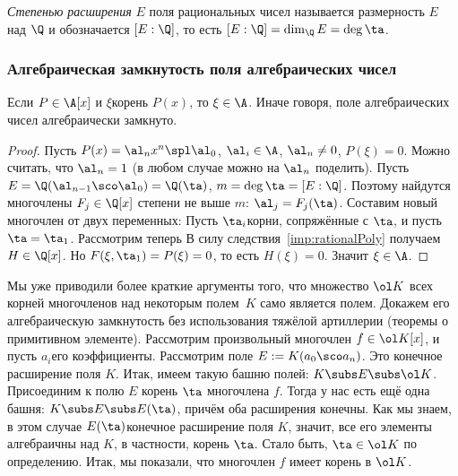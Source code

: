 \documentclass[a4paper]{article}
\begin{document}
\begin{df}
\emph{Степенью расширения} $E$ поля рациональных чисел называется размерность $E$ над $\Q$ и
обозначается $[E:\Q]$, то есть $[E:\Q]=\dim_{\Q}E=\deg\ta$.
\end{df}

\subsubsection{Алгебраическая замкнутость поля алгебраических чисел}

\begin{theorem}\label{thm:algClosureClosed}
Если $P\in\A[x]$ и $\xi$\т корень $P(x)$, то $\xi\in\A$. Иначе говоря, поле алгебраических чисел
алгебраически замкнуто.
\end{theorem}
\begin{proof}
Пусть $P(x)=\al_n x^n\spl \al_0$, $\al_i\in\A$, $\al_n\neq0$, $P(\xi)=0$. Можно считать,
что $\al_n=1$ (в любом случае можно на $\al_n$ поделить). Пусть
$E=\Q(\al_{n-1}\sco \al_0)=\Q(\ta)$, $m=\deg \ta=[E:\Q]$. Поэтому найдутся
многочлены $F_j\in\Q[x]$ степени не выше $m$: $\al_j=F_j(\ta)$. Составим новый многочлен от
двух переменных:
Пусть $\ta_i$\т корни, сопряжённые с $\ta$, и пусть $\ta = \ta_1$.
Рассмотрим теперь
В силу следствия~\ref{imp:rationalPoly} получаем $H\in\Q[x]$. Но $F(\xi,\ta_1)=P(\xi)=0$, то есть
$H(\xi)=0$. Значит $\xi\in\A$.
\end{proof}

\begin{petit}
Мы уже приводили более краткие аргументы того, что множество $\ol K$ всех корней многочленов над некоторым полем~$K$
само является полем. Докажем его алгебраическую замкнутость без использования тяжёлой артиллерии (теоремы о примитивном элементе).
Рассмотрим произвольный многочлен $f \in \ol K[x]$,
и пусть $a_i$\т его коэффициенты. Рассмотрим поле $E := K(a_0\sco a_n)$. Это конечное расширение поля $K$.
Итак, имеем такую башню полей: $K \subs E \subs \ol K$. Присоединим к полю $E$ корень $\ta$ многочлена $f$.
Тогда у нас есть ещё одна башня: $K \subs E \subs E(\ta)$, причём оба расширения конечны. Как мы знаем, в этом случае
$E(\ta)$\т конечное расширение поля $K$, значит, все его элементы алгебраичны над $K$, в частности, корень $\ta$.
Стало быть, $\ta \in \ol K$ по определению. Итак, мы показали, что многочлен $f$ имеет корень в $\ol K$.
\end{petit}
\end{document}
